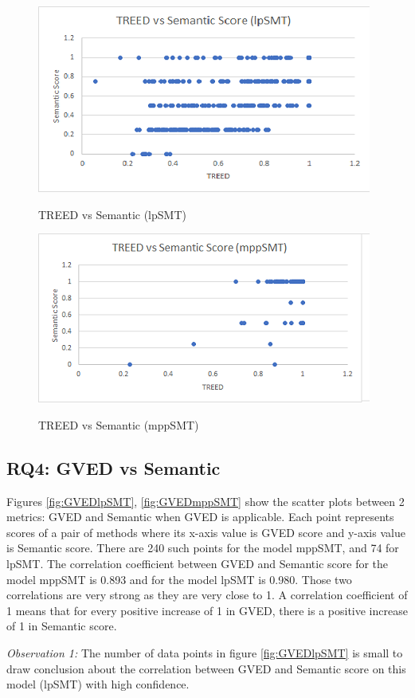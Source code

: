  
\begin{figure}
\caption{TREED vs Semantic (lpSMT)}
\centering
\includegraphics{img/treed_lpSMT.png}
\label{fig:TREEDlpSMT}
\end{figure}

\begin{figure}
\caption{TREED vs Semantic (mppSMT)}
\centering
\includegraphics{img/treed_mppSMT.png}
\label{fig:TREEDmppSMT}
\end{figure}

\subsection{RQ4: GVED vs Semantic}
Figures \ref{fig:GVEDlpSMT}, \ref{fig:GVEDmppSMT}  show the scatter plots between 2 metrics: GVED and Semantic when GVED is applicable. Each point represents scores of a pair of methods where its x-axis value is GVED score and y-axis value is Semantic score. There are 240 such points for the model mppSMT, and 74 for lpSMT. 
The correlation coefficient between GVED and Semantic score for the model mppSMT is 0.893 and for the model lpSMT is 0.980. Those two correlations are very strong as they are very close to 1. A correlation coefficient of 1 means that for every positive increase of 1 in GVED, there is a positive increase of 1 in Semantic score. 

\emph{Observation 1:} The number of data points in figure \ref{fig:GVEDlpSMT} is small to draw conclusion about the correlation between GVED and Semantic score on this model (lpSMT) with high confidence. 

